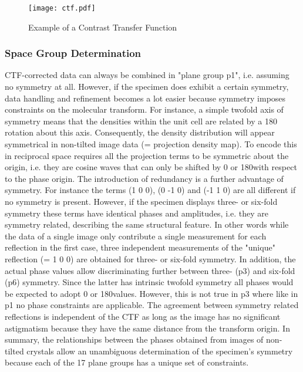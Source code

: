 	\begin{figure}[H]
		\centering
		\texttt{[image: ctf.pdf]}
		\caption{Example of a Contrast Transfer Function}
		\label{fig:ctf}
	\end{figure}
	
\newpage

\subsubsection{Space Group Determination}	
\label{sec:space_group}

CTF-corrected data can always be combined in "plane group p1", i.e. assuming no symmetry at all. However, if the specimen does exhibit a certain symmetry, data handling and refinement becomes a lot easier because symmetry imposes constraints on the molecular transform. For instance, a simple twofold axis of symmetry means that the densities within the unit cell are related by a 180\textdegree
rotation about this axis. Consequently, the density distribution will appear symmetrical in non-tilted image data (= projection density map). To encode this in reciprocal space requires all the projection terms to be symmetric about the origin, i.e. they are cosine waves that can only be shifted by 0 or 180\textdegree with respect to the phase origin.
The introduction of redundancy is a further advantage of symmetry. For instance the terms (1 0 0), (0 -1 0) and (-1 1 0) are all different if no symmetry is present. However, if the specimen displays three- or six-fold symmetry these terms have identical phases and amplitudes, i.e. they are symmetry related, describing the same structural feature. In other words while the data of a single image only contribute a single measurement for each reflection in the first case, three independent measurements of the "unique" reflection (= 1 0 0) are obtained for three- or six-fold symmetry. In addition, the actual phase values allow discriminating further between three- (p3) and six-fold (p6) symmetry. Since the latter has intrinsic twofold symmetry all phases would be expected to adopt 0 or 180\textdegree values. However, this is not true in p3 where like in p1 no phase constraints are applicable. The agreement between symmetry related reflections is independent of the CTF as long as the image has no significant astigmatism because they have the same distance from the transform origin. 
In summary, the relationships between the phases obtained from images of non-tilted crystals allow an unambiguous determination of the specimen's symmetry because each of the 17 plane groups has a unique set of constraints. 

